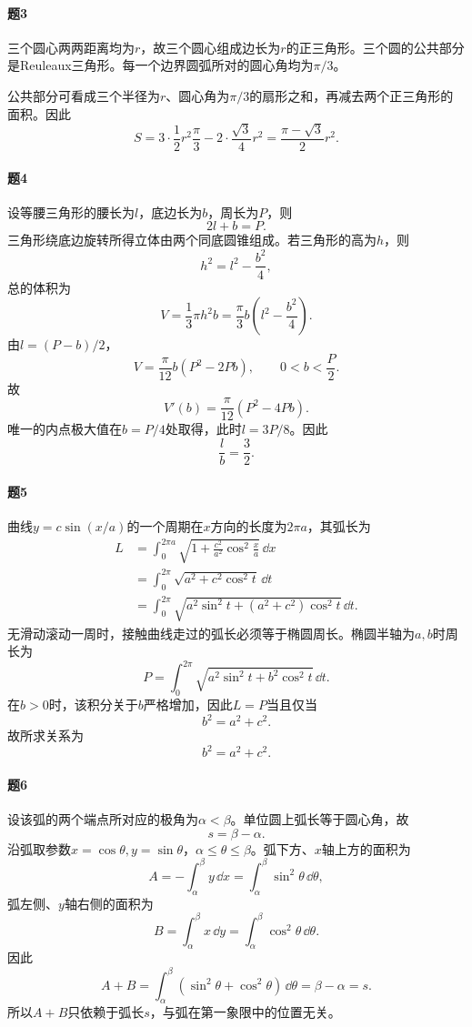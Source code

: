 \paragraph{题3}
\begin{xsolution}
三个圆心两两距离均为$r$，故三个圆心组成边长为$r$的正三角形。三个圆的公共部分是Reuleaux三角形。每一个边界圆弧所对的圆心角均为$\pi/3$。

公共部分可看成三个半径为$r$、圆心角为$\pi/3$的扇形之和，再减去两个正三角形的面积。因此
\[
 S=3\cdot\frac12r^2\frac\pi3
 -2\cdot\frac{\sqrt3}{4}r^2
 =\frac{\pi-\sqrt3}{2}r^2.
\]
\end{xsolution}

\paragraph{题4}
\begin{xsolution}
设等腰三角形的腰长为$l$，底边长为$b$，周长为$P$，则
\[
 2l+b=P.
\]
三角形绕底边旋转所得立体由两个同底圆锥组成。若三角形的高为$h$，则
\[
 h^2=l^2-\frac{b^2}{4},
\]
总的体积为
\[
 V=\frac13\pi h^2b
 =\frac\pi3b\left(l^2-\frac{b^2}{4}\right).
\]
由$l=(P-b)/2$，
\[
 V=\frac\pi{12}b(P^2-2Pb),\qquad 0<b<\frac P2.
\]
故
\[
 V'(b)=\frac\pi{12}(P^2-4Pb).
\]
唯一的内点极大值在$b=P/4$处取得，此时$l=3P/8$。因此
\[
 \boxed{\frac lb=\frac32}.
\]
\end{xsolution}

\paragraph{题5}
\begin{xsolution}
曲线$y=c\sin(x/a)$的一个周期在$x$方向的长度为$2\pi a$，其弧长为
\begin{align*}
L&=\int_0^{2\pi a}\sqrt{1+\frac{c^2}{a^2}\cos^2\frac xa}\,\dd x\\
&=\int_0^{2\pi}\sqrt{a^2+c^2\cos^2 t}\,\dd t\\
&=\int_0^{2\pi}\sqrt{a^2\sin^2 t+(a^2+c^2)\cos^2 t}\,\dd t.
\end{align*}
无滑动滚动一周时，接触曲线走过的弧长必须等于椭圆周长。椭圆半轴为$a,b$时周长为
\[
 P=\int_0^{2\pi}\sqrt{a^2\sin^2 t+b^2\cos^2 t}\,\dd t.
\]
在$b>0$时，该积分关于$b$严格增加，因此$L=P$当且仅当
\[
 b^2=a^2+c^2.
\]
故所求关系为
\[
 \boxed{b^2=a^2+c^2}.
\]
\end{xsolution}

\paragraph{题6}
\begin{xsolution}
设该弧的两个端点所对应的极角为$\alpha<\beta$。单位圆上弧长等于圆心角，故
\[
 s=\beta-\alpha.
\]
沿弧取参数$x=\cos\theta,y=\sin\theta$，$\alpha\le\theta\le\beta$。弧下方、$x$轴上方的面积为
\[
 A=-\int_{\alpha}^{\beta}y\,\dd x
 =\int_\alpha^\beta\sin^2\theta\,\dd\theta,
\]
弧左侧、$y$轴右侧的面积为
\[
 B=\int_{\alpha}^{\beta}x\,\dd y
 =\int_\alpha^\beta\cos^2\theta\,\dd\theta.
\]
因此
\[
 A+B=\int_\alpha^\beta(\sin^2\theta+\cos^2\theta)\,\dd\theta
 =\beta-\alpha=s.
\]
所以$A+B$只依赖于弧长$s$，与弧在第一象限中的位置无关。
\end{xsolution}

